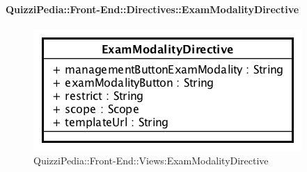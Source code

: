 \paragraph{QuizziPedia::Front-End::Directives::ExamModalityDirective}
\begin{figure} [ht]
	\centering
	\includegraphics[scale=0.80]{UML/Classi/Front-End/QuizziPedia_Front-end_ExamModalityDirective.png}
	\caption{QuizziPedia::Front-End::Views:ExamModalityDirective}
\end{figure} \FloatBarrier
